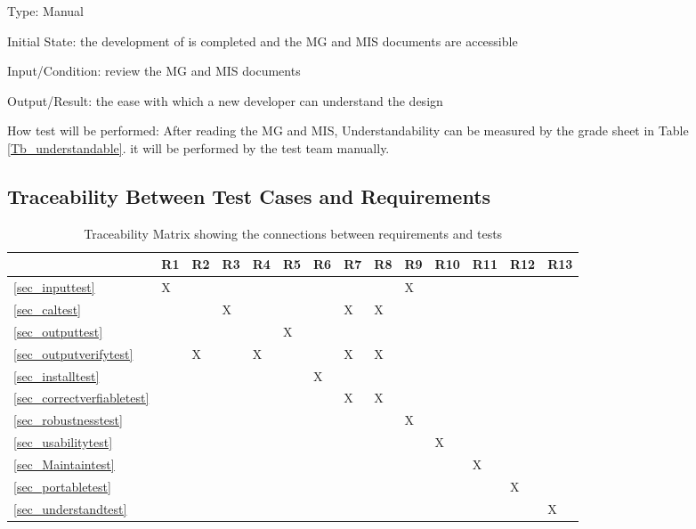 \documentclass[12pt, titlepage]{article}
\begin{document}
\begin{enumerate}
Type: Manual
					
Initial State: the development of \progname{} is completed and the MG and MIS
documents are accessible
					
Input/Condition: review the MG and MIS documents
					
Output/Result: the ease
with which a new developer can understand the design
					
How test will be performed: After reading the MG and MIS, Understandability can
be measured by the grade sheet in Table \ref{Tb_understandable}. it will be
performed by the test team manually.

\end{enumerate}

\subsection{Traceability Between Test Cases and Requirements}

\begin{table}[h]
\begin{tabular}{|l|l|l|l|l|l|l|l|l|l|l|l|l|l|}
\hline
 & R1 & R2 & R3 & R4 & R5 & R6 & R7 & R8 & R9 & R10 & R11 & R12 & R13 \\ \hline
\ref{sec_inputtest} & X &  &  &  &  &  &  &  & X &  &  &  &  \\ \hline
\ref{sec_caltest} &  &  & X &  &  &  & X & X &  &  &  &  &  \\ \hline
\ref{sec_outputtest} &  &  &  &  & X &  &  &  &  &  &  &  &  \\ \hline
\ref{sec_outputverifytest} &  & X &  & X &  &  & X & X &  &  &  &  &  \\ \hline
\ref{sec_installtest} &  &  &  &  &  & X &  &  &  &  &  &  &  \\ \hline
\ref{sec_correctverfiabletest} &  &  &  &  &  &  & X & X &  &  &  &  &  \\ \hline
\ref{sec_robustnesstest} &  &  &  &  &  &  &  &  & X &  &  &  &  \\ \hline
\ref{sec_usabilitytest} &  &  &  &  &  &  &  &  &  & X &  &  &  \\ \hline
\ref{sec_Maintaintest} &  &  &  &  &  &  &  &  &  &  & X &  &  \\ \hline
\ref{sec_portabletest} &  &  &  &  &  &  &  &  &  &  &  & X &  \\ \hline
\ref{sec_understandtest} &  &  &  &  &  &  &  &  &  &  &  &  & X \\ \hline
\end{tabular}
\caption{Traceability Matrix showing the connections between requirements and tests}
\label{Tb_trace}
\end{table}
\end{document}
